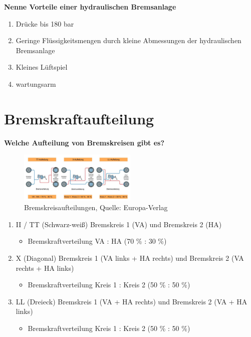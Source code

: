 \textbf{Nenne Vorteile einer hydraulischen Bremsanlage}

\begin{enumerate}
\item
  Drücke bis 180 bar
\item
  Geringe Flüssigkeitsmengen durch kleine Abmessungen der hydraulischen
  Bremsanlage
\item
  Kleines Lüftspiel
\item
  wartungsarm
\end{enumerate}

\newpage

\section{Bremskraftaufteilung}\label{bremskraftaufteilung}

\textbf{Welche Aufteilung von Bremskreisen gibt es?}

\begin{figure}[!ht]%
\centering
\includegraphics[width=0.5\textwidth]{images/Bremsen/Bremsen-2.pdf}
\caption{Bremskreisaufteilungen, Quelle: Europa-Verlag}
\end{figure}

\begin{enumerate}
\item
  II / TT (Schwarz-weiß) Bremskreis 1 (VA) und Bremskreis 2 (HA)

  \begin{itemize}
  \item
    Bremskraftverteilung VA : HA (70 \% : 30 \%)
  \end{itemize}
\item
  X (Diagonal) Bremskreis 1 (VA links + HA rechts) und Bremskreis 2 (VA
  rechts + HA links)

  \begin{itemize}
  \item
    Bremskraftverteilung Kreis 1 : Kreis 2 (50 \% : 50 \%)
  \end{itemize}
\item
  LL (Dreieck) Bremskreis 1 (VA + HA rechts) und Bremskreis 2 (VA + HA
  links)

  \begin{itemize}
  \item
    Bremskraftverteilung Kreis 1 : Kreis 2 (50 \% : 50 \%)
  \end{itemize}
\end{enumerate}

